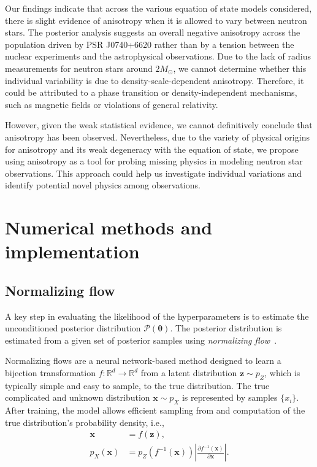 \documentclass[prd,twocolumn,a4paper,floatfix,nofootinbib,preprintnumbers,superscriptaddress]{revtex4-1}
\begin{document}
Our findings indicate that across the various equation of state models considered, there is slight evidence of anisotropy when it is allowed to vary between neutron stars. The posterior analysis suggests an overall negative anisotropy across the population driven by PSR J0740+6620 rather than by a tension between the nuclear experiments and the astrophysical observations. Due to the lack of radius measurements for neutron stars around $2M_\odot$, we cannot determine whether this individual variability is due to density-scale-dependent anisotropy. Therefore, it could be attributed to a phase transition or density-independent mechanisms, such as magnetic fields or violations of general relativity.

However, given the weak statistical evidence, we cannot definitively conclude that anisotropy has been observed. Nevertheless, due to the variety of physical origins for anisotropy and its weak degeneracy with the equation of state, we propose using anisotropy as a tool for probing missing physics in modeling neutron star observations. This approach could help us investigate individual variations and identify potential novel physics among observations.

\appendix
\section{Numerical methods and implementation}
\subsection{Normalizing flow}
\label{sec:nf}
A key step in evaluating the likelihood of the hyperparameters is to estimate the unconditioned posterior distribution $\mathcal{P}(\boldsymbol{\theta})$. The posterior distribution is estimated from a given set of posterior samples using \textit{normalizing flow}~\cite{Kobyzev:2019ydm, Papamakarios:2019fms}.

Normalizing flows are a neural network-based method designed to learn a bijection transformation $f:\mathbb{R}^d\to \mathbb{R}^d$ from a latent distribution $\boldsymbol{z} \sim p_Z$, which is typically simple and easy to sample, to the true distribution. The true complicated and unknown distribution $\boldsymbol{x} \sim p_X$ is represented by samples $\{x_i\}$. After training, the model allows efficient sampling from and computation of the true distribution's probability density, i.e.,
\begin{equation}
\begin{aligned}
    \boldsymbol{x} &= f(\boldsymbol{z}),\\
    p_X(\boldsymbol{x}) &= p_Z(f^{-1}(\boldsymbol{x})) \left \vert \frac{\partial f^{-1}(\boldsymbol{x})}{\partial \boldsymbol{x}} \right\vert.
\end{aligned}
\end{equation}
\end{document}
